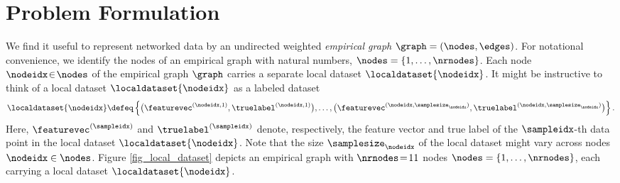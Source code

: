 \documentclass[lettersize,journal]{IEEEtran}
\begin{document}
\section{Problem Formulation}
\label{sec:format}



We find it useful to represent networked data by an undirected weighted \emph{empirical graph} $\graph=(\nodes,\edges)$. 
For notational convenience, we identify the nodes of an empirical graph with natural numbers, $\nodes = \{1,\ldots,\nrnodes\}$. 
Each node $ \nodeidx \!\in\!\nodes$ of the empirical graph $\graph$ carries a separate local dataset $\localdataset{\nodeidx}$. 
It might be instructive to think of a local dataset  $\localdataset{\nodeidx}$ as a labeled dataset 
\vspace{-2mm}
\begin{equation} 
	\label{equ_def_local_dataset_plain}
\localdataset{\nodeidx} \defeq \left\{ \big(\featurevec^{(\nodeidx,1)},\truelabel^{(\nodeidx,1)}\big), \ldots,\big(\featurevec^{(\nodeidx,\samplesize_{\nodeidx})},\truelabel^{(\nodeidx,\samplesize_{\nodeidx})}\big) \right\}. %
\vspace{-2mm}
\end{equation} 
Here, $\featurevec^{(\sampleidx)}$ and $\truelabel^{(\sampleidx)}$ denote, respectively, the 
feature vector and true label of the $\sampleidx$-th data point in the local dataset $\localdataset{\nodeidx}$. 
Note that the size $\samplesize_{\nodeidx}$ of the local dataset might vary across nodes $\nodeidx \in \nodes$. 
Figure \ref{fig_local_dataset} depicts an empirical graph with $\nrnodes\!=\!11$ nodes $\nodes=\{1,\ldots,\nrnodes\}$, 
each carrying a local dataset $\localdataset{\nodeidx}$.  
\end{document}

